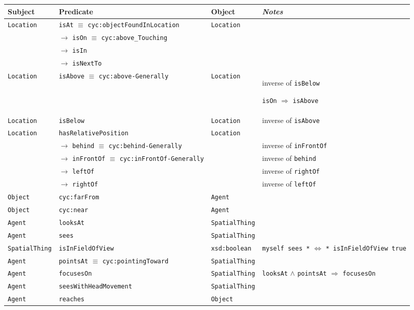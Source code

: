 \documentclass[preprint,3p,times]{elsarticle}
\newcommand{\concept}[1]{{\small \texttt{#1}}}
\begin{document}
\renewcommand{\concept}[1]{{\scriptsize \texttt{#1}}}
\begin{table}[h]
    \centering
    \begin{tabular}{p{1.5cm}lp{2cm}p{3.7cm}}
    \textbf{Subject} & \textbf{Predicate} & \textbf{Object} & \emph{Notes} \\ 
    \hline
	 \concept{Location} & \concept{isAt} $\equiv$ \concept{cyc:objectFoundInLocation}  &  \concept{Location} & \\ 
	 &  $\rightarrow$ \concept{isOn} $\equiv$ \concept{cyc:above\_Touching}  &  & \\ 
	 &  $\rightarrow$ \concept{isIn}  &  & \\ 
	 &  $\rightarrow$ \concept{isNextTo}  & &  \\ 
	 \concept{Location}  & \concept{isAbove} $\equiv$ \concept{cyc:above-Generally}  &  \concept{Location}  &  inverse of \concept{isBelow} \par \concept{isOn} $\Rightarrow$ \concept{isAbove}\\ 
	 \concept{Location}  & \concept{isBelow}  & \concept{Location}  &  inverse
	of \concept{isAbove} \\
	\hline
	 \concept{Location}  & \concept{hasRelativePosition}  & \concept{Location} & \\ 
	 & 	$\rightarrow$ \concept{behind} $\equiv$ \concept{cyc:behind-Generally}  &  & inverse of \concept{inFrontOf}  \\ 
	 &  $\rightarrow$ \concept{inFrontOf} $\equiv$ \concept{cyc:inFrontOf-Generally}  & 	 & 	 inverse of \concept{behind}  \\ 
	 &  $\rightarrow$ \concept{leftOf}  &  &  inverse of \concept{rightOf} \\ 
	 &  $\rightarrow$ \concept{rightOf}  & 	 & 	 inverse of \concept{leftOf}  \\ 
	 \concept{Object}  & \concept{cyc:farFrom}  &  \concept{Agent} & \\ 
	 \concept{Object}  & \concept{cyc:near}  &  \concept{Agent} & \\

		\hline
		 \concept{Agent}  & \concept{looksAt}  & \concept{SpatialThing} \\
		 \concept{Agent}  & \concept{sees}  &  \concept{SpatialThing}  &    \\ 
		 \concept{SpatialThing}  & \concept{isInFieldOfView}  & \concept{xsd:boolean}  & \par \tiny \concept{myself sees *} $\Leftrightarrow$ \concept{* isInFieldOfView true} \\ 
		 \concept{Agent}  & \concept{pointsAt} $\equiv$ \concept{cyc:pointingToward}  & \concept{SpatialThing} \\ 
		 \concept{Agent}  & \concept{focusesOn}  &  \concept{SpatialThing}  &  \par \tiny \concept{looksAt} $\wedge$ \concept{pointsAt} $\Rightarrow$ \concept{focusesOn} \\
		\concept{Agent} & \concept{seesWithHeadMovement} &  \concept{SpatialThing} \\
		\concept{Agent} & \concept{reaches} &  \concept{Object} \\ 


\end{tabular}
\end{table}
\end{document}
